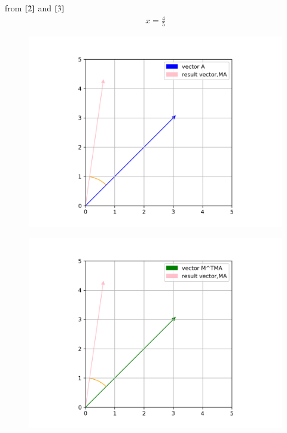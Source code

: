 \documentclass[a5paper,10pt]{article}
\begin{document}
from $\eqref{2}$ and $\eqref{3}$
\begin{align}
    x=\frac{4}{5}
\end{align}
\begin{figure}[H]
    \centering
    \includegraphics[width=0.7\columnwidth]{figs/fig1.png}
    \caption{}
    \label{fig:placeholder}
\end{figure}
\begin{figure}[H]
    \centering
    \includegraphics[width=0.7\columnwidth]{figs/fig2.png}
    \caption{}
    \label{fig:placeholder}
\end{figure}
\end{document}
